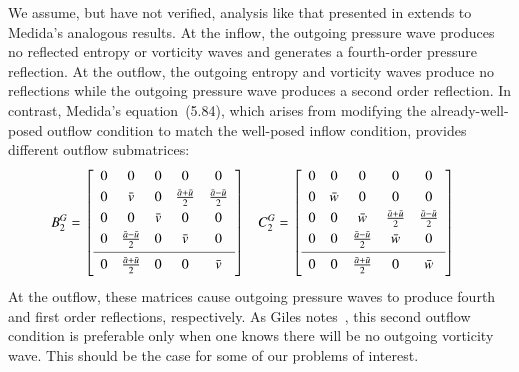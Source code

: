 \documentclass[letterpaper,11pt,nointlimits,reqno,draft]{amsart}
\begin{document}
We assume, but have not verified, analysis like that presented in
\citet[\textsection{}3.7.4]{Giles1988Nonreflecting} extends to Medida's
analogous results.  At the inflow, the outgoing pressure wave produces no
reflected entropy or vorticity waves and generates a fourth-order pressure
reflection.  At the outflow, the outgoing entropy and vorticity waves produce
no reflections while the outgoing pressure wave produces a second order
reflection.  In contrast, Medida's equation~(5.84), which arises from modifying
the already-well-posed outflow condition to match the well-posed inflow
condition, provides different outflow submatrices:
\begin{align}
\label{eq:dimeulerapproxmedidaopt2}
  B^G_2 &= \left[\begin{array}{ccccc}
    0 & 0                         & 0       & 0                           & 0                         \\ \noalign{\smallskip}
    0 & \bar{v}                   & 0       & \frac{\bar{a} + \bar{u}}{2} & \frac{\bar{a}-\bar{u}}{2} \\ \noalign{\smallskip}
    0 & 0                         & \bar{v} & 0                           & 0                         \\ \noalign{\smallskip}
    0 & \frac{\bar{a}-\bar{u}}{2} & 0       & \bar{v}                     & 0                         \\ \noalign{\smallskip} \hline \noalign{\smallskip}
    0 & \frac{\bar{a}+\bar{u}}{2} & 0       & 0                           & \bar{v}                   \\ \noalign{\smallskip}
  \end{array}\right]
&
  C^G_2 &= \left[\begin{array}{ccccc}
    0 & 0       & 0                         & 0                         & 0                         \\ \noalign{\smallskip}
    0 & \bar{w} & 0                         & 0                         & 0                         \\ \noalign{\smallskip}
    0 & 0       & \bar{w}                   & \frac{\bar{a}+\bar{u}}{2} & \frac{\bar{a}-\bar{u}}{2} \\ \noalign{\smallskip}
    0 & 0       & \frac{\bar{a}-\bar{u}}{2} & \bar{w}                   & 0                         \\ \noalign{\smallskip} \hline \noalign{\smallskip}
    0 & 0       & \frac{\bar{a}+\bar{u}}{2} & 0                         & \bar{w}                   \\ \noalign{\smallskip}
  \end{array}\right]
\end{align}
At the outflow, these matrices cause outgoing pressure waves to produce fourth
and first order reflections, respectively.  As Giles
notes~\citep{Giles1990Nonreflecting}, this second outflow condition is
preferable only when one knows there will be no outgoing vorticity wave.  This
should be the case for some of our problems of interest.
\end{document}
